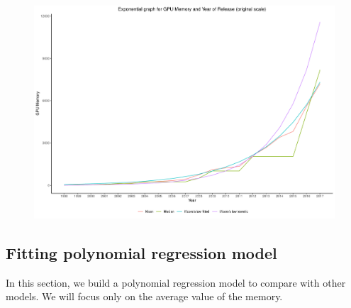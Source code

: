 \documentclass[a4paper]{article}
\begin{document}
\begin{figure}[H]
    \centering
    \includegraphics[keepaspectratio, width=1\textwidth, height=1\textheight]{EM/exp_graph.pdf}
\end{figure}
\subsection{Fitting polynomial regression model}
In this section, we build a polynomial regression model to compare with other models. We will focus only on the average value of the memory.
\end{document}
